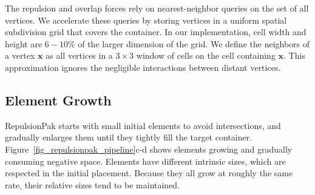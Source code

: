 
The repulsion and overlap forces rely on nearest-neighbor queries on the
set of all vertices.  We accelerate these queries by storing vertices in a
uniform spatial subdivision grid that covers the container.  In our
implementation, cell width and height are $6-10$\% of the larger dimension
of the grid.  
We define the neighbors of a vertex $\bm{x}$ as
all vertices in a $3\times 3$ window of cells  on the cell
containing $\bm{x}$. 
This approximation ignores the negligible interactions between
distant vertices.



\subsection{Element Growth}
\label{repulsionpak_element_growth}

RepulsionPak starts with small initial elements to avoid intersections,
and gradually enlarges them until they tightly fill the target
container.  Figure~\ref{fig_repulsionpak_pipeline}c-d shows elements growing and gradually
consuming negative space.  Elements have different intrinsic sizes, which are
respected in the initial placement.  Because they all grow at roughly the
same rate, their relative sizes tend to be maintained.

